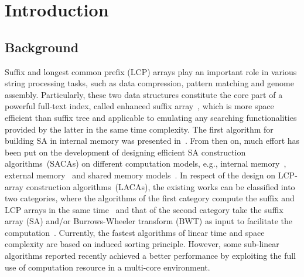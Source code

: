 \documentclass[10pt,journal,compsoc]{IEEEtran}
\begin{document}
\IEEEpeerreviewmaketitle

\section{Introduction}\label{sec:introduction}

\subsection{Background} \label{sec:introduction:background}


Suffix and longest common prefix (LCP) arrays play an important role in various string processing tasks, such as data compression, pattern matching and genome assembly. Particularly, these two data structures constitute the core part of a powerful full-text index, called enhanced suffix array~\cite{Abouelhodaa2004}, which is more space efficient than suffix tree and applicable to emulating any searching functionalities provided by the latter in the same time complexity. The first algorithm for building SA in internal memory was presented in~\cite{Manber1993}. From then on, much effort has been put on the development of designing efficient SA construction algorithms~(SACAs) on different computation models, e.g., internal memory~\cite{Karkkainen2003, Ko2003, Kim2003, Nong11}, external memory~\cite{Dementiev2008, Ferragina2012, Manzini2004, Bingmann12, Karkkainen2014, Nong14, Nong15} and shared memory models~\cite{Osipov2012, Deo2013, Wang2015, Karkkainen2015}. In respect of the design on LCP-array construction algorithms~(LACAs), the existing works can be classified into two categories, where the algorithms of the first category compute the suffix and LCP arrays in the same time~\cite{Fischer11, Bingmann12, Flick2015} and that of the second category take the suffix array (SA) and/or Burrows-Wheeler transform (BWT) as input to facilitate the computation~\cite{Kasai2001,Karkkainen2009, Fischer11, Puglisi2008, Puglisi2008, Deo2013, Karkkainen2016}. Currently, the fastest algorithms of linear time and space complexity are based on induced sorting principle. However, some sub-linear algorithms reported recently achieved a better performance by exploiting the full use of computation resource in a multi-core environment.
 
\end{document}
